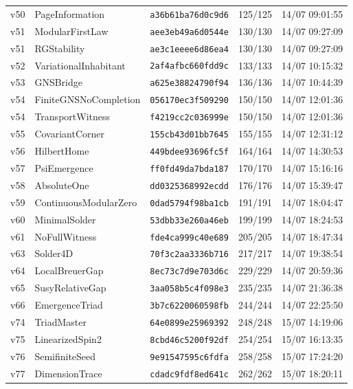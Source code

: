 \documentclass[11pt]{article}
\theoremstyle{definition}\newtheorem{deriv}{Derivação}
\begin{document}
{\begin{longtable}{@{}lllll@{}}
v50 & PageInformation & \texttt{a36b61ba76d0c9d6} & 125/125 & 14/07 09:01:55 \\
v51 & ModularFirstLaw & \texttt{aee3eb49a6d0544e} & 130/130 & 14/07 09:27:09 \\
v51 & RGStability & \texttt{ae3c1eeee6d86ea4} & 130/130 & 14/07 09:27:09 \\
v52 & VariationalInhabitant & \texttt{2af4afbc660fdd9c} & 133/133 & 14/07 10:15:32 \\
v53 & GNSBridge & \texttt{a625e38824790f94} & 136/136 & 14/07 10:44:39 \\
v54 & FiniteGNSNoCompletion & \texttt{056170ec3f509290} & 150/150 & 14/07 12:01:36 \\
v54 & TransportWitness & \texttt{f4219cc2c036999e} & 150/150 & 14/07 12:01:36 \\
v55 & CovariantCorner & \texttt{155cb43d01bb7645} & 155/155 & 14/07 12:31:12 \\
v56 & HilbertHome & \texttt{449bdee93696fc5f} & 164/164 & 14/07 14:30:53 \\
v57 & PsiEmergence & \texttt{ff0fd49da7bda187} & 170/170 & 14/07 15:16:16 \\
v58 & AbsoluteOne & \texttt{dd0325368992ecdd} & 176/176 & 14/07 15:39:47 \\
v59 & ContinuousModularZero & \texttt{0dad5794f98ba1cb} & 191/191 & 14/07 18:04:47 \\
v60 & MinimalSolder & \texttt{53dbb33e260a46eb} & 199/199 & 14/07 18:24:53 \\
v61 & NoFullWitness & \texttt{fde4ca999c40e689} & 205/205 & 14/07 18:47:34 \\
v63 & Solder4D & \texttt{70f3c2aa3336b716} & 217/217 & 14/07 19:38:54 \\
v64 & LocalBreuerGap & \texttt{8ec73c7d9e703d6c} & 229/229 & 14/07 20:59:36 \\
v65 & SusyRelativeGap & \texttt{3aa058b5c4f098e3} & 235/235 & 14/07 21:36:38 \\
v66 & EmergenceTriad & \texttt{3b7c6220060598fb} & 244/244 & 14/07 22:25:50 \\
v74 & TriadMaster & \texttt{64e0899e25969392} & 248/248 & 15/07 14:19:06 \\
v75 & LinearizedSpin2 & \texttt{8cbd46c5200f92df} & 254/254 & 15/07 16:13:35 \\
v76 & SemifiniteSeed & \texttt{9e91547595c6fdfa} & 258/258 & 15/07 17:24:20 \\
v77 & DimensionTrace & \texttt{cdadc9fdf8ed641c} & 262/262 & 15/07 18:20:11 \\

\end{longtable}}
\end{document}
